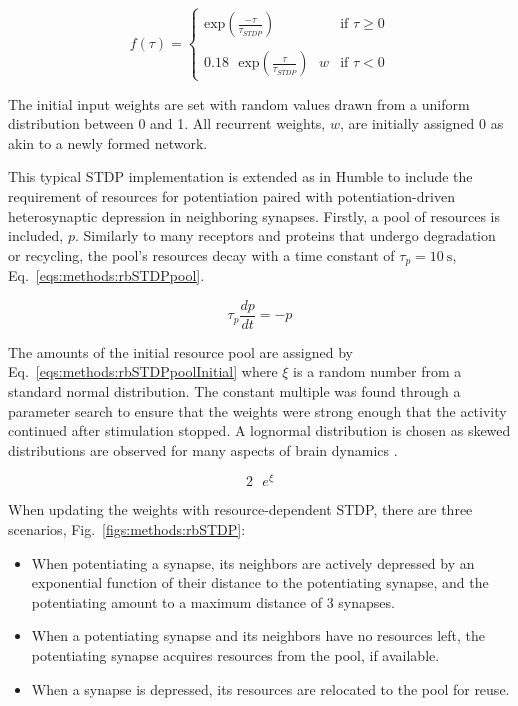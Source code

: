 \documentclass[utf8]{FrontiersinHarvard} %
\begin{document}
\begin{equation}
    f(\tau) = 	\begin{cases}
                    \mathrm{exp} \left (%
                    \frac{-\tau}{\tau_{STDP}} \right ) & \mbox{if } \tau \geq 0 \\ \\
                    0.18 \text{ } \mathrm{exp} \left (%
                    \frac{\tau}{\tau_{STDP}} \right ) \text{ } w & \mbox{if } \tau < 0
                \end{cases}
    \label{eqs:methods:expSTDP}
\end{equation}

The initial input weights are set with random values drawn from a uniform distribution between \SI{0}{} and \SI{1}{}. All recurrent weights, $w$, are initially assigned \SI{0}{} as akin to a newly formed network.

This typical STDP implementation is extended as in Humble \citeyearpar{Humble.2013} to include the requirement of resources for potentiation paired with potentiation-driven heterosynaptic depression in neighboring synapses. Firstly, a pool of resources is included, $p$. Similarly to many receptors and proteins that undergo degradation or recycling, the pool's resources decay with a time constant of $\tau_{p}=\SI{10}{\second}$, Eq.~\ref{eqs:methods:rbSTDPpool}.

\begin{equation}
    \tau_{p} \frac{dp}{dt}= -p
    \label{eqs:methods:rbSTDPpool}
\end{equation}

The amounts of the initial resource pool are assigned by Eq.~\ref{eqs:methods:rbSTDPpoolInitial} where $\xi$ is a random number from a standard normal distribution. The constant multiple was found through a parameter search to ensure that the weights were strong enough that the activity continued after stimulation stopped. A lognormal distribution is chosen as skewed distributions are observed for many aspects of brain dynamics \citep{Buzsaki.2014}.

\begin{equation}
    2 \text{ } e^{\xi}
    \label{eqs:methods:rbSTDPpoolInitial}
\end{equation}

When updating the weights with resource-dependent STDP, there are three scenarios, Fig.~\ref{figs:methods:rbSTDP}:

\begin{itemize}
    \item When potentiating a synapse, its neighbors are actively depressed by an exponential function of their distance to the potentiating synapse, and the potentiating amount to a maximum distance of \SI{3}{} synapses.

    \item When a potentiating synapse and its neighbors have no resources left, the potentiating synapse acquires resources from the pool, if available.

    \item When a synapse is depressed, its resources are relocated to the pool for reuse.
\end{itemize}
\end{document}

